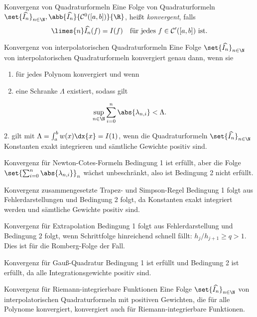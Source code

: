 \begin{karte}{Konvergenz von Quadraturformeln}
    Eine Folge von Quadraturformeln \( \set{\widehat{I_n}}_{n\in\N}, \abb{\widehat{I_n}}{\mathcal{C}^0([a,b])}{\R} \), 
    heißt \textit{konvergent}, falls 
    \[ \limes{n} \widehat{I_n}(f) = I(f) \quad \text{für jedes } f \in \mathcal{C^0}([a,b]) \text{ ist}. \]
\end{karte}

\begin{karte}{Konvergenz von interpolatorischen Quadraturformeln}
    Eine Folge \( \set{\widehat{I_n}}_{n\in\N} \) von interpolatorischen Quadraturformeln 
    konvergiert genau dann, wenn sie 
    \begin{enumerate}
        \item für jedes Polynom konvergiert und wenn
        \item eine Schranke \(\Lambda\) existiert, sodass gilt 
    \end{enumerate}
    \[ \sup_{n\in\N} \sum_{i=0}^n \abs{\lambda_{n,i}} < \Lambda. \]

    2. gilt mit \( \Lambda = \int_a^b w(x) \dx{x} = I(1) \), wenn die Quadraturformeln \( \set{\widehat{I_n}}_{n\in\N} \) 
    Konstanten exakt integrieren und sämtliche Gewichte positiv sind.
\end{karte}

\begin{karte}{Konvergenz für Newton-Cotes-Formeln}
    Bedingung 1 ist erfüllt, aber die Folge \( \set{ \sum_{i=0}^n \abs{\lambda_{n,i}} }_n \) 
    wächst unbeschränkt, also ist Bedingung 2 nicht erfüllt.
\end{karte}

\begin{karte}{Konvergenz zusammengesetzte Trapez- und Simpson-Regel}
    Bedingung 1 folgt aus Fehlerdarstellungen und Bedingung 2 folgt, da Konstanten exakt 
    integriert werden und sämtliche Gewichte positiv sind.
\end{karte}

\begin{karte}{Konvergenz für Extrapolation}
    Bedingung 1 folgt aus Fehlerdarstellung und Bedingung 2 folgt, wenn Schrittfolge hinreichend schnell 
    fällt: \( h_j/h_{j+1} \geq q > 1 \). Dies ist für die Romberg-Folge der Fall.
\end{karte}

\begin{karte}{Konvergenz für Gauß-Quadratur}
    Bedingung 1 ist erfüllt und Bedingung 2 ist erfüllt, da alle Integrationsgewichte positiv sind.
\end{karte}

\begin{karte}{Konvergenz für Riemann-integrierbare Funktionen}
    Eine Folge \( \set{\widehat{I_n}}_{n\in\N} \) von interpolatorischen Quadraturformeln mit positiven 
    Gewichten, die für alle Polynome konvergiert, konvergiert auch für Riemann-integrierbare Funktionen.
\end{karte}